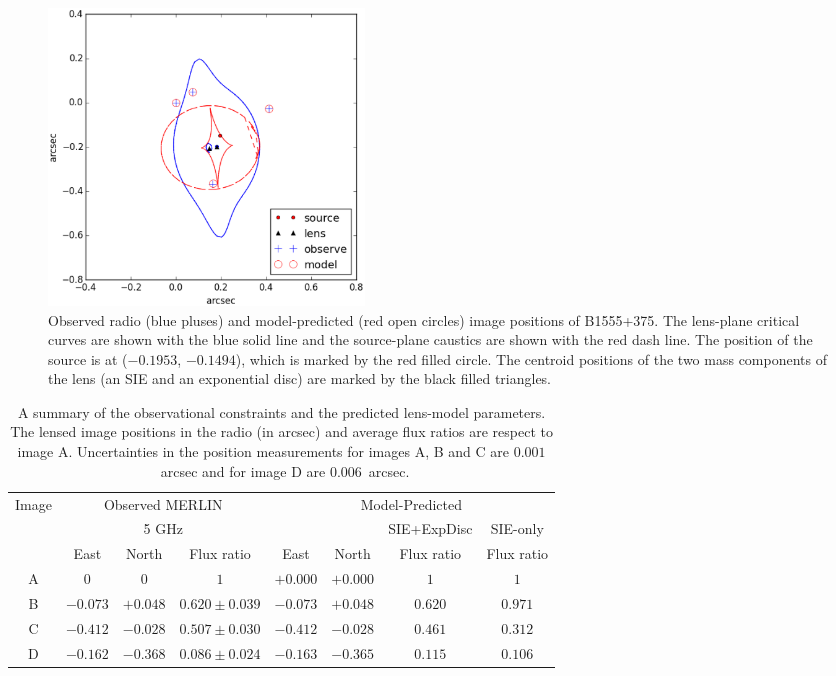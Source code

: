 \documentclass[a4paper,fleqn,usenatbib,useAMS]{mnras}
\begin{document}
\begin{figure}
\includegraphics[width=84mm]{gravlens_exp_try5_plot.eps}
\caption{Observed radio (blue pluses) and model-predicted (red open circles) image positions of B1555+375. The lens-plane critical curves are shown with the blue solid line and the source-plane caustics are shown with the red dash line. The position of the source is at ($-0.1953$, $-0.1494$), which is marked by the red filled circle. The centroid positions of the two mass components of the lens (an SIE and an exponential disc) are marked by the black filled triangles.}
\label{fig:model}
\end{figure}

\begin{table}
\centering
\caption{A summary of the observational constraints and the predicted lens-model parameters. The lensed image positions in the radio \citep{Marlow99} (in arcsec) and average flux ratios \citep{K03} are respect to image A. Uncertainties in the position measurements for images A, B and C are $0.001$~arcsec and for image D are $0.006$~arcsec.}
\begin{tabular}{cccccccc}
\hline
Image	&\multicolumn{3}{c}{Observed MERLIN} 	 	& \multicolumn{4}{c}{Model-Predicted}\\
		&\multicolumn{3}{c}{5 GHz}		& & & {SIE+ExpDisc} & SIE-only\\
		&East &North & Flux ratio &East 	&North & Flux ratio &Flux ratio\\ 
\hline
A  &$0$    		&$0$			&  $1$ 				&$+0.000$  &$+0.000$	& $1$ 		& $1$\\  
B  &$-0.073$	&$+0.048$	& $0.620 \pm 0.039$ 	&$-0.073$ &$+0.048$		& $0.620$ 	& $0.971$ \\  
C  &$-0.412$ 	&$-0.028$	& $0.507\pm 0.030$	&$-0.412$ &$-0.028$		& $0.461$ 	& $0.312$\\  
D  &$-0.162$	&$-0.368$	& $0.086 \pm 0.024$ 	&$-0.163$ &$-0.365$		& $0.115$ 	& $0.106$\\  
\hline
\end{tabular}
\label{tab:results}
\end{table}
\end{document}
